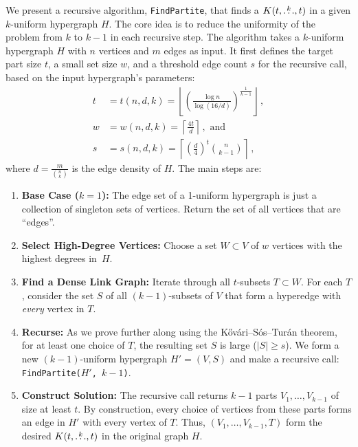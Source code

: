 We present a recursive algorithm, \texttt{FindPartite}, that finds a $K(t, \overset{k}{\dots}, t)$ in a given $k$-uniform hypergraph $H$.
The core idea is to reduce the uniformity of the problem from $k$ to $k-1$ in each recursive step.
The algorithm takes a $k$-uniform hypergraph $H$ with $n$ vertices and $m$ edges as input.
It first defines the target part size $t$, a small set size $w$,
and a threshold edge count $s$ for the recursive call, based on the input hypergraph's parameters:
\begin{align*}
    t &= t(n, d, k) = \left\lfloor \left( \frac{\log n}{\log (16/d)}  \right)^{\frac{1}{k-1}} \right \rfloor\,, \\
    w &= w(n, d, k) = \left\lceil \frac{4 t}{d} \right\rceil\,, \text{ and } \\
    s &= s(n, d, k) = \left\lceil \left( \frac{d}{4} \right)^t \binom{n}{k-1} \right\rceil\,,
\end{align*}
where $d = \frac{m}{\binom{n}{k}}$ is the edge density of $H$.
The main steps are:
\begin{enumerate}
    \item \textbf{Base Case ($k=1$):} The edge set of a 1-uniform hypergraph is just a collection of singleton sets of vertices.
    Return the set of all vertices that are ``edges''.

    \item \textbf{Select High-Degree Vertices:} Choose a set $W \subset V$ of $w$ vertices with the highest degrees in~$H$. \label{W}

    \item \textbf{Find a Dense Link Graph:} Iterate through all $t$-subsets $T \subset W$.
    For each $T$, consider the set $S$ of all $(k-1)$-subsets of $V$ that form a hyperedge with \emph{every} vertex in $T$. \label{link}

    \item \textbf{Recurse:} As we prove further along using the Kőv\'{a}ri–S\'{o}s–Tur\'{a}n theorem, for at least one choice of $T$,
    the resulting set $S$ is large ($|S| \ge s$). We form a new $(k-1)$-uniform hypergraph $H'=(V, S)$ and make a recursive call: \texttt{FindPartite($H'$, $k-1$)}.

    \item \textbf{Construct Solution:} The recursive call returns $k-1$ parts $V_1, \dots, V_{k-1}$ of size at least $t$.
    By construction, every choice of vertices from these parts forms an edge in $H'$ with every vertex of $T$.
    Thus, $(V_1, \dots, V_{k-1}, T)$ form the desired $K(t, \overset{k}{\dots}, t)$ in the original graph $H$.

\end{enumerate}

